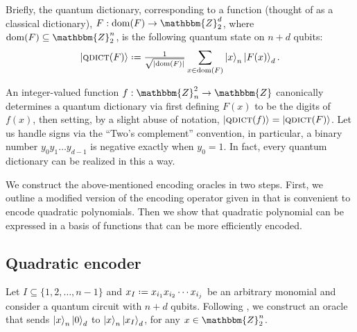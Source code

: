 \documentclass[reqno,10pt]{amsart}
\numberwithin{equation}{section}                %
\let\originalleft\left
\let\originalright\right
\renewcommand{\left}{\mathopen{}\mathclose\bgroup\originalleft}
\renewcommand{\right}{\aftergroup\egroup\originalright}
\def\({\mathopen{}\left(}
\def\){\right)\mathclose{}}
\newcommand*{\eqdef}{\mathrel{\vcenter{\baselineskip0.5ex \lineskiplimit0pt\hbox{.}\hbox{.}}}=}
\def\Z{\mathbbm{Z}}
\def\dom{\mathrm{dom}}
\def\qdict{\textsc{qdict}}
\begin{document}
Briefly, the quantum dictionary, corresponding to a function (thought of as a classical dictionary), $F: \dom \( F \) \rightarrow \Z_2^d$, where $\dom \( F \) \subseteq \Z_2^n$, is the following quantum state on $n + d$ qubits:
\begin{equation}
   \ket{\qdict \( F \)} \eqdef \tfrac{1}{\sqrt{\left| \dom \( F \) \right|}} \sum\limits_{x \in \dom \( F \)} \ket{x}_n \ket{F (x)}_d.
\end{equation}

An integer-valued function $f : \Z_n^2 \rightarrow \Z$ canonically determines a quantum dictionary via first defining $F (x)$ to be the digits of $f (x)$, then setting, by a slight abuse of notation, $\ket{\qdict \( f \)} = \ket{\qdict \( F \)}$. Let us handle signs via the ``Two's complement'' convention, in particular, a binary number $y_0 y_1 \ldots y_{d - 1}$ is negative exactly when $y_0 = 1$. In fact, every quantum dictionary can be realized in this a way.

\smallskip

We construct the above-mentioned encoding oracles in two steps. First, we outline a modified version of the encoding operator given in \cite{gilliam_grover_2021} that is convenient to encode quadratic polynomials. Then we show that quadratic polynomial can be expressed in a basis of functions that can be more efficiently encoded.

\medskip

\subsection{Quadratic encoder}
\label{sec:quad}

Let $I \subseteq \{ 1, 2, \ldots, n - 1 \}$ and $x_I \eqdef x_{i_1} x_{i_2} \cdots x_{i_j}$ be an arbitrary monomial and consider a quantum circuit with $n + d$ qubits. Following \cite{gilliam_grover_2021}, we construct an oracle that sends $\ket{x}_n \ket{0}_d$ to $\ket{x}_n \ket{x_I}_d$, for any $x \in \Z_2^n$.
\end{document}
